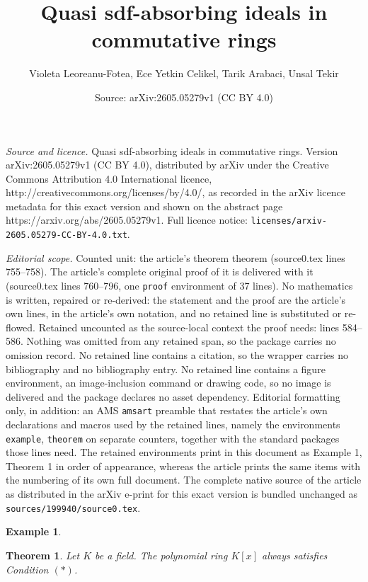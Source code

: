 \documentclass[10pt,a4paper]{amsart}
\title{Quasi sdf-absorbing ideals in commutative rings}
\author{Violeta Leoreanu-Fotea, Ece Yetkin Celikel, Tarik Arabaci, Unsal Tekir}
\date{Source: arXiv:2605.05279v1 (CC BY 4.0)}
\newtheorem{example}{Example}
\newtheorem{theorem}{Theorem}
\begin{document}
\maketitle

\noindent\emph{Source and licence.} Quasi sdf-absorbing ideals in commutative rings. Version arXiv:2605.05279v1 (CC BY 4.0), distributed by arXiv under the Creative Commons Attribution 4.0 International licence, http://creativecommons.org/licenses/by/4.0/, as recorded in the arXiv licence metadata for this exact version and shown on the abstract page https://arxiv.org/abs/2605.05279v1. Full licence notice: \texttt{licenses/arxiv-2605.05279-CC-BY-4.0.txt}.\par\smallskip

\noindent\textit{Editorial scope.} Counted unit: the article's theorem theorem (source0.tex lines 755--758). The article's complete original proof of it is delivered with it (source0.tex lines 760--796, one \texttt{proof} environment of 37 lines). No mathematics is written, repaired or re-derived: the statement and the proof are the article's own lines, in the article's own notation, and no retained line is substituted or re-flowed.  Retained uncounted as the source-local context the proof needs: lines 584--586.  Nothing was omitted from any retained span, so the package carries no omission record.  No retained line contains a citation, so the wrapper carries no bibliography and no bibliography entry.  No retained line contains a figure environment, an image-inclusion command or drawing code, so no image is delivered and the package declares no asset dependency.  Editorial formatting only, in addition: an AMS \texttt{amsart} preamble that restates the article's own declarations and macros used by the retained lines, namely the environments \texttt{example}, \texttt{theorem} on separate counters, together with the standard packages those lines need.  The retained environments print in this document as Example 1, Theorem 1 in order of appearance, whereas the article prints the same items with the numbering of its own full document.  The complete native source of the article as distributed in the arXiv e-print for this exact version is bundled unchanged as \texttt{sources/199940/source0.tex}.
\begin{example}
\label{estar} \ 
\end{example}

\begin{theorem}
Let $K$ be a field. The polynomial ring $K[x]$ always satisfies Condition
$(\ast)$.
\end{theorem}
\end{document}
